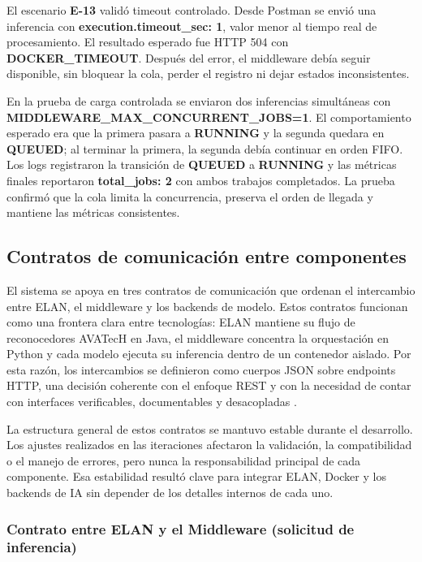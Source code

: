 \documentclass[11pt,a4paper]{article}
\begin{document}
El escenario \textbf{E-13} validó timeout controlado. Desde Postman se envió una inferencia con \textbf{execution.timeout\_sec: 1}, valor menor al tiempo real de procesamiento. El resultado esperado fue HTTP 504 con \textbf{DOCKER\_TIMEOUT}. Después del error, el middleware debía seguir disponible, sin bloquear la cola, perder el registro ni dejar estados inconsistentes.

En la prueba de carga controlada se enviaron dos inferencias simultáneas con \textbf{MIDDLEWARE\_MAX\_CONCURRENT\_JOBS=1}. El comportamiento esperado era que la primera pasara a \textbf{RUNNING} y la segunda quedara en \textbf{QUEUED}; al terminar la primera, la segunda debía continuar en orden FIFO. Los logs registraron la transición de \textbf{QUEUED} a \textbf{RUNNING} y las métricas finales reportaron \textbf{total\_jobs: 2} con ambos trabajos completados. La prueba confirmó que la cola limita la concurrencia, preserva el orden de llegada y mantiene las métricas consistentes.


\subsection{Contratos de comunicación entre componentes}

El sistema se apoya en tres contratos de comunicación que ordenan el intercambio entre ELAN, el middleware y los backends de modelo. Estos contratos funcionan como una frontera clara entre tecnologías: ELAN mantiene su flujo de reconocedores AVATecH en Java, el middleware concentra la orquestación en Python y cada modelo ejecuta su inferencia dentro de un contenedor aislado. Por esta razón, los intercambios se definieron como cuerpos JSON sobre endpoints HTTP, una decisión coherente con el enfoque REST y con la necesidad de contar con interfaces verificables, documentables y desacopladas \cite{fielding2000rest}.

La estructura general de estos contratos se mantuvo estable durante el desarrollo. Los ajustes realizados en las iteraciones afectaron la validación, la compatibilidad o el manejo de errores, pero nunca la responsabilidad principal de cada componente. Esa estabilidad resultó clave para integrar ELAN, Docker y los backends de IA sin depender de los detalles internos de cada uno.

\subsubsection{Contrato entre ELAN y el Middleware (solicitud de inferencia)}
\end{document}
